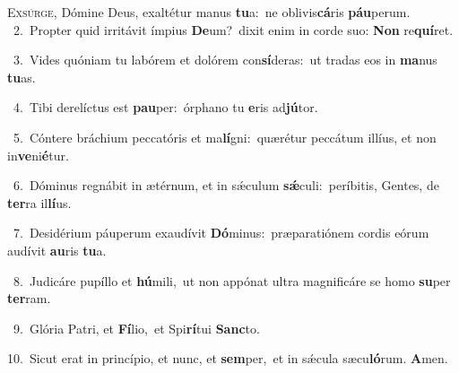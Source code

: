 \lettrine{\initial\textcolor{\initialcolor}{E}}{xsúrge,} Dómine Deus, exaltétur manus \textbf{tu}\-a:~\star ne oblivis\-\textbf{cá}\-ris \textbf{páu}\-perum.\\
{\numbfont\textcolor{\numbcolor}{~2.}}~Propter quid irritávit ímpius \textbf{De}\-um?~\star dixit enim in corde suo: \textbf{Non} re\-\textbf{quí}\-ret.\par
{\numbfont\textcolor{\numbcolor}{~3.}}~Vides quóniam tu labórem et dolórem con\-\textbf{sí}\-deras:~\star ut tradas eos in \textbf{ma}\-nus \textbf{tu}\-as.\par
{\numbfont\textcolor{\numbcolor}{~4.}}~Tibi derelíctus est \textbf{pau}\-per:~\star órphano tu \textbf{e}\-ris ad\-\textbf{jú}\-tor.\par
{\numbfont\textcolor{\numbcolor}{~5.}}~Cóntere bráchium peccatóris et ma\-\textbf{lí}\-gni:~\star quærétur peccátum illíus, et non in\-\textbf{ve}\-ni\-\textbf{é}\-tur.\par
{\numbfont\textcolor{\numbcolor}{~6.}}~Dóminus regnábit in ætérnum, et in sǽculum \textbf{sǽ}\-culi:~\star períbitis, Gentes, de \textbf{ter}\-ra il\-\textbf{lí}\-us.\par
{\numbfont\textcolor{\numbcolor}{~7.}}~Desidérium páuperum exaudívit \textbf{Dó}\-minus:~\star præparatiónem cordis eórum audívit \textbf{au}\-ris \textbf{tu}\-a.\par
{\numbfont\textcolor{\numbcolor}{~8.}}~Judicáre pupíllo et \textbf{hú}\-mili,~\star ut non appónat ultra magnificáre se homo \textbf{su}\-per \textbf{ter}\-ram.\par
{\numbfont\textcolor{\numbcolor}{~9.}}~Glória Patri, et \textbf{Fí}\-lio,~\star et Spi\-\textbf{rí}\-tui \textbf{Sanc}\-to.\par
{\numbfont\textcolor{\numbcolor}{10.}}~Sicut erat in princípio, et nunc, et \textbf{sem}\-per,~\star et in sǽcula sæcu\-\textbf{ló}\-rum. \textbf{A}\-men.\par
